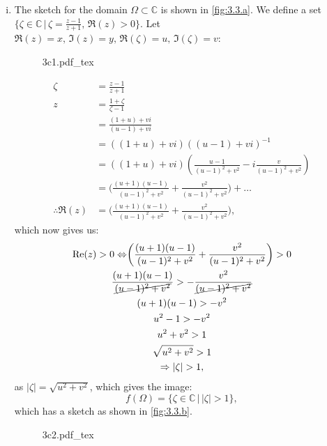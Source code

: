 \documentclass[a4paper, titlepage, DIV=14]{scrartcl}
\newcommand{\incfig}[1]{%
    \def\svgwidth{0.8\columnwidth}
    {#1.pdf_tex}
}
\begin{document}
\begin{enumerate}
\begin{enumerate}[i)]
            
            \item The sketch for the domain $\Omega \subset \mathbb{C}$ is shown in \autoref{fig:3.3.a}. We define a set 
            $\{\zeta \in \mathbb{C} \, | \, \zeta = \frac{z-1}{z+1}, \, \Re(z) > 0 \}$. Let $\Re(z)=x, \, \Im(z)=y, \, 
            \Re(\zeta) = u, \, \Im(\zeta) = v$:
            \begin{figure}[!h]
                \centering
                \incfig{3c1}
                \caption{}
                \label{fig:3.3.a}
            \end{figure}
            \begin{align*}
                \zeta &= \frac{z-1}{z+1} \\
                z &= \frac{1+\zeta}{\zeta-1} \\
                    &= \frac{(1+u)+vi}{(u-1)+vi} \\
                    &= ((1+u)+vi)((u-1)+vi)^{-1} \\
                    &= ((1+u)+vi)(\frac{u-1}{(u-1)^{2}+v^{2}} 
                        - i\frac{v}{(u-1)^{2}+v^{2}}) \\
                    &= \biggr(\frac{(u+1)(u-1)}{(u-1)^{2}+v^{2}} 
                        + \frac{v^{2}}{(u-1)^{2}+v^{2}}\biggr) + \ldots \\
                \therefore \Re(z) &= \biggr(\frac{(u+1)(u-1)}{(u-1)^{2}+v^{2}} 
                + \frac{v^{2}}{(u-1)^{2}+v^{2}}\biggr),
            \end{align*}which now gives us:
            \begin{gather*}
                \Re(z) > 0 \Leftrightarrow \biggr(\frac{(u+1)(u-1)}{(u-1)^{2}+v^{2}} 
                + \frac{v^{2}}{(u-1)^{2}+v^{2}}\biggr) > 0 \\
                \frac{(u+1)(u-1)}{\cancel{(u-1)^{2}+v^{2}}} > - \frac{v^{2}}{\cancel{(u-1)^{2}+v^{2}}} \\
                (u+1)(u-1) > -v^{2} \\
                u^{2}-1 > -v^{2} \\
                u^{2} + v^{2} > 1 \\
                \sqrt{u^{2} + v^{2}} > 1 \\
                \Rightarrow |\zeta| > 1,
            \end{gather*} as $|\zeta| = \sqrt{u^{2} + v^{2}}$, which gives the image:
            \begin{equation*}
                f(\Omega) = \{\zeta \in \mathbb{C} \, | \, |\zeta| > 1\},
            \end{equation*} which has a sketch as shown in \autoref{fig:3.3.b}.
            \begin{figure}[!h]
                \centering
                \incfig{3c2}
                \caption{}
                \label{fig:3.3.b}
            \end{figure} \\
        

\end{enumerate}
\end{enumerate}
\end{document}

